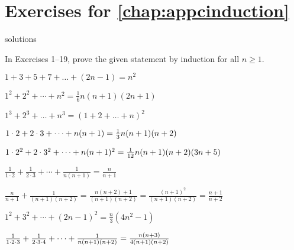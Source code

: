 \section*{Exercises for \ref{chap:appcinduction}}

\begin{Filesave}{solutions}
\end{Filesave}

\begin{multicols}{2}

\noindent In Exercises 1--19, prove the given statement by induction for all $n \ge 1$.

\begin{ex}
$1 + 3 + 5 + 7 + \dots  + (2n - 1) = n^{2}$
\end{ex}

\begin{ex}
$1^2 + 2^2 + \cdots + n^2 = \frac{1}{6}n(n+1)(2n+1)$
\end{ex}

\begin{ex}
$1^{3} + 2^{3} + \dots  + n^{3} = (1 + 2 + \dots  + n)^{2}$
\end{ex}

\begin{ex}
$1 \cdot 2 + 2 \cdot 3 + \cdots + n(n+1) \\
= \frac{1}{3} n (n+1)(n+2)$
\end{ex}

\begin{ex}
$1 \cdot 2^2 + 2 \cdot 3^2 + \cdots + n(n+1)^2 \\
= \frac{1}{12} n(n+1)(n+2)(3n+5)$ 
\end{ex}

\begin{ex}
$\frac{1}{1 \cdot 2} + \frac{1}{2 \cdot 3} + \cdots + \frac{1}{n(n+1)} = \frac{n}{n+1}$

\begin{sol}
$\frac{n}{n+1} + \frac{1}{(n+1)(n+2)} = \frac{n(n+2)+1}{(n+1)(n+2)} = \frac{(n+1)^2}{(n+1)(n+2)} = \frac{n+1}{n+2}$
\end{sol}
\end{ex}

\begin{ex}
$1^2 + 3^2 + \cdots + (2n-1)^2 = \frac{n}{3} (4n^2 -1)$
\end{ex}

\begin{ex}
$\frac{1}{1 \cdot 2 \cdot 3} + \frac{1}{2 \cdot 3 \cdot 4} + \cdots + \frac{1}{n(n+1)(n+2)} \\
= \frac{n(n+3)}{4(n+1)(n+2)}$
\end{ex}


\end{multicols}
